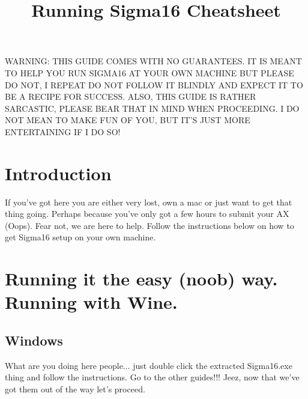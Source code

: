 \documentclass{article}
\title{Running Sigma16 Cheatsheet}
\begin{document}
\maketitle


WARNING: THIS GUIDE COMES WITH NO GUARANTEES. IT IS MEANT TO HELP YOU RUN SIGMA16 AT YOUR OWN MACHINE BUT PLEASE DO NOT, I REPEAT DO NOT FOLLOW IT BLINDLY AND EXPECT IT TO BE A RECIPE FOR SUCCESS. ALSO, THIS GUIDE IS RATHER SARCASTIC, PLEASE BEAR THAT IN MIND WHEN PROCEEDING. I DO NOT MEAN TO MAKE FUN OF YOU, BUT IT'S JUST MORE ENTERTAINING IF I DO SO!


\section{Introduction}

 If you've got here you are either very lost, own a mac or just want to get that thing going. Perhaps because you've only got a few hours to submit your AX (Oops). Fear not, we are here to help. Follow the instructions below on how to get Sigma16 setup on your own machine.

\section{Running it the easy (noob) way. Running with Wine.}

\setcounter{subsection}{-1}
 \subsection{Windows}
   What are you doing here people... just double click the extracted Sigma16.exe thing and follow the instructions. Go to the other guides!!! Jeez, now that we've got them out of the way let's proceed.
\end{document}

